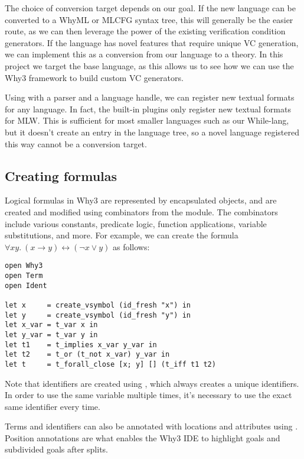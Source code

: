 The choice of conversion target depends on our goal.
If the new language can be converted to a WhyML or MLCFG syntax tree,
this will generally be the easier route,
as we can then leverage the power of the existing verification condition generators.
If the language has novel features that require unique VC generation,
we can implement this as a conversion from our language to a theory.
In this project we target the base language,
as this allows us to see how we can use the Why3 framework to build custom VC generators.

Using  with a parser and a language handle,
we can register new textual formats for any language.
In fact, the built-in plugins only register new textual formats for MLW.
This is sufficient for most smaller languages such as our While-lang,
but it doesn't create an entry in the language tree,
so a novel language registered this way cannot be a conversion target.

\subsection{Creating formulas}

Logical formulas in Why3 are represented by encapsulated  objects,
and are created and modified using combinators from the  module.
The combinators include various constants, predicate logic, function applications,
variable substitutions, and more.
For example, we can create the formula
$\forall x y.~(x \rightarrow y) \leftrightarrow (\neg x \lor y)$
as follows:
\begin{lstlisting}
open Why3
open Term
open Ident

let x     = create_vsymbol (id_fresh "x") in
let y     = create_vsymbol (id_fresh "y") in
let x_var = t_var x in
let y_var = t_var y in
let t1    = t_implies x_var y_var in
let t2    = t_or (t_not x_var) y_var in
let t     = t_forall_close [x; y] [] (t_iff t1 t2)
\end{lstlisting}

Note that identifiers are created using ,
which always creates a unique identifiers.
In order to use the same variable multiple times,
it's necessary to use the exact same identifier every time.

Terms and identifiers can also be annotated with locations and attributes using
.
Position annotations are what enables the Why3 IDE to highlight goals
and subdivided goals after splits.


